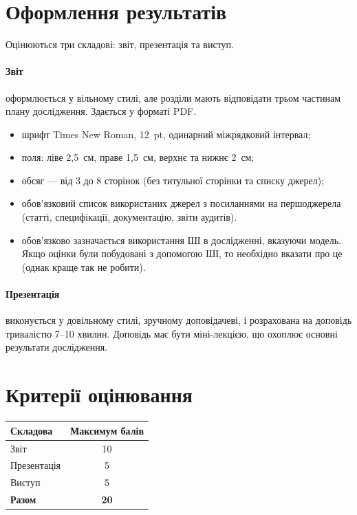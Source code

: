 \documentclass{../../test-template}
\begin{document}
\section*{Оформлення результатів}

Оцінюються три складові: звіт, презентація та виступ.

\paragraph{Звіт} оформлюється у вільному стилі, але розділи мають відповідати
трьом частинам плану дослідження. Здається у форматі PDF.
\begin{itemize}
    \item шрифт Times New Roman, 12~pt, одинарний міжрядковий інтервал;
    \item поля: ліве 2,5~см, праве 1,5~см, верхнє та нижнє 2~см;
    \item обсяг --- від 3 до 8 сторінок (без титульної сторінки та списку джерел);
    \item обов'язковий список використаних джерел з посиланнями на першоджерела
    (статті, специфікації, документацію, звіти аудитів).
    \item обов'язково зазначається використання ШІ в дослідженні, вказуючи модель. Якщо оцінки були побудовані з допомогою ШІ, то необхідно вказати про це (однак краще так не робити).
\end{itemize}

\paragraph{Презентація} виконується у довільному стилі, зручному доповідачеві,
і розрахована на доповідь тривалістю 7--10 хвилин. Доповідь має бути
міні-лекцією, що охоплює основні результати дослідження.

\section*{Критерії оцінювання}

\begin{center}
\begin{tabular}{|l|c|}
    \hline
    \textbf{Складова} & \textbf{Максимум балів} \\ \hline
    Звіт         & 10 \\ \hline
    Презентація  & 5  \\ \hline
    Виступ       & 5  \\ \hline
    \textbf{Разом} & \textbf{20} \\ \hline
\end{tabular}
\end{center}
\end{document}

